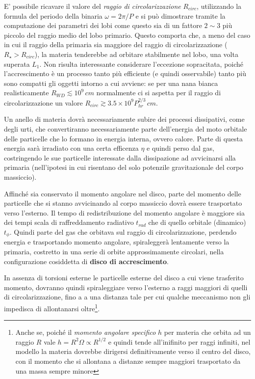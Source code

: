 \documentclass[a4paperbi]{article}
\begin{document}
	E' possibile ricavare il valore del \textit{raggio di circolarizzazione} $R_{circ}$, utilizzando la formula del periodo della binaria $\omega=2\pi/P$ e si può dimostrare tramite la computazione dei parametri dei lobi come questo sia di un fattore $2\sim3$ più piccolo del raggio medio del lobo primario. Questo comporta che, a meno del caso in cui il raggio della primaria sia maggiore del raggio di circolarizzazione ($R_\star>R_{circ}$), la materia tenderebbe ad orbitare stabilmente nel lobo, una volta superata $L_1$.
	Non risulta interessante considerare l'eccezione sopracitata, poiché l'accrescimento è un processo tanto più efficiente (e quindi osservabile) tanto più sono compatti gli oggetti intorno a cui avviene: se per una nana bianca realisticamente $R_{WD}\lesssim10^9\,cm$ normalmente ci si aspetta per il raggio di circolarizzazione un valore $R_{circ}\gtrsim3.5\times10^9P_{hr}^{2/3}\,cm$.

	Un anello di materia dovrà necessariamente subire dei processi dissipativi, come degli urti, che convertiranno necessariamente parte dell'energia del moto orbitale delle particelle che lo formano in energia interna, ovvero calore. Parte di questa energia sarà irradiato con una certa efficenza $\eta$ e quindi perso dal gas, costringendo le sue particelle interessate dalla dissipazione ad avvicinarsi alla primaria (nell'ipotesi in cui risentano del solo potenzile gravitazionale del corpo massiccio). 
	
	Affinché sia conservato il momento angolare nel disco, parte del momento delle particelle che si stanno avvicinando al corpo massiccio dovrà essere trasportato verso l'esterno. Il tempo di redistribuzione del momento angolare è maggiore sia dei tempi scala di raffreddamento radiativo $t_{rad}$ che di quello orbitale (dinamico) $t_{\phi}$. Quindi parte del gas che orbitava sul raggio di circolarizzazione, perdendo energia e trasportando momento angolare, spiraleggerà lentamente verso la primaria, costretto in una serie di orbite approssimamente circolari, nella configurazione cosiddetta di \textbf{disco di accrescimento}. 	
	
	In assenza di torsioni esterne le particelle esterne del disco a cui viene trasferito momento, dovranno quindi spiraleggiare verso l'esterno a raggi maggiori di quelli di circolarizzazione, fino a a una distanza tale per cui qualche meccanismo non gli impedisca di allontanarsi oltre\footnote{Anche se, poiché il \textit{momento angolare specifico} $h$ per materia che orbita ad un raggio $R$ vale $h=R^2\Omega\propto R^{1/2}$ e quindi tende all'inifinito per raggi infiniti, nel modello la materia dovrebbe dirigersi definitivamente verso il centro del disco, con il momento che si allontana a distanze sempre maggiori trasportato da una massa sempre minore}.
		
\end{document}
